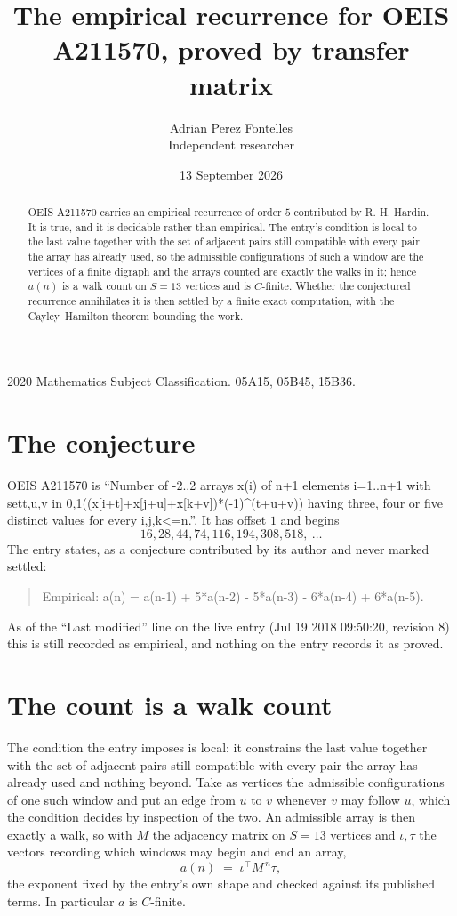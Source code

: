 \documentclass[11pt,a4paper]{article}
\title{The empirical recurrence for OEIS A211570, proved by transfer matrix}
\author{Adrian Perez Fontelles\\ \small Independent researcher}
\date{13 September 2026}
\theoremstyle{plain}
\theoremstyle{definition}
\begin{document}
\maketitle

\begin{abstract}
OEIS A211570 carries an empirical recurrence of order $5$ contributed by R. H. Hardin. It is
true, and it is decidable rather than empirical. The entry's condition is local to the last value together with the set of adjacent pairs still compatible with every pair the array has already used, so
the admissible configurations of such a window are the vertices of a finite digraph and the
arrays counted are exactly the walks in it; hence $a(n)$ is a walk count on $S=13$ vertices
and is $C$-finite. Whether the conjectured recurrence annihilates it is then settled by a
finite exact computation, with the Cayley--Hamilton theorem bounding the work.
\end{abstract}

\noindent\small 2020 Mathematics Subject Classification. 05A15, 05B45, 15B36.\normalsize

\section{The conjecture}

OEIS A211570 is ``Number of -2..2 arrays x(i) of n+1 elements i=1..n+1 with set{t,u,v in 0,1}((x[i+t]+x[j+u]+x[k+v])*(-1)\^{}(t+u+v)) having three, four or five distinct values for every i,j,k<=n.''. It has offset $1$ and begins
\[
16, 28, 44, 74, 116, 194, 308, 518,\ \dots
\]
The entry states, as a conjecture contributed by its author and never marked settled:
\begin{quote}
Empirical: a(n) = a(n-1) + 5*a(n-2) - 5*a(n-3) - 6*a(n-4) + 6*a(n-5).
\end{quote}
As of the ``Last modified'' line on the live entry (Jul 19 2018 09:50:20, revision 8) this is still
recorded as empirical, and nothing on the entry records it as proved.

\section{The count is a walk count}

The condition the entry imposes is local: it constrains the last value together with the set of adjacent pairs still compatible with every pair the array has already used and nothing beyond. Take as
vertices the admissible configurations of one such window and put an edge from $u$ to $v$
whenever $v$ may follow $u$, which the condition decides by inspection of the two. An
admissible array is then exactly a walk, so with $M$ the adjacency matrix on $S=13$ vertices
and $\iota,\tau$ the vectors recording which windows may begin and end an array,
\[
a(n)\;=\;\iota^{\!\top}M^{\,n}\tau ,
\]
the exponent fixed by the entry's own shape and checked against its published terms. In
particular $a$ is $C$-finite.
\end{document}
